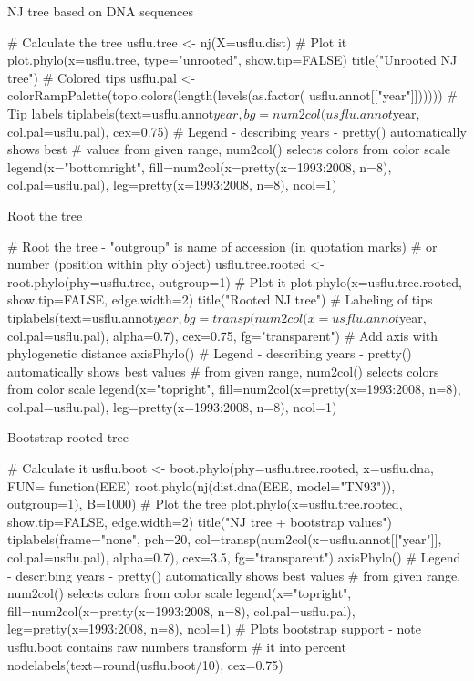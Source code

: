 \documentclass[compress, xelatex, 11pt, xcolor=svgnames, aspectratio=169,
	hyperref={
		bookmarks=true,
		unicode=true,
		colorlinks=true,
		pdftitle={Molecular data in R},
		plainpages=false,
		pdfauthor={Vojtech Zeisek},
		pdfsubject={Course about phylogeny and evolution in R},
		pdfcreator={XeLaTeX},
		pdfkeywords={R, evolution, phylogeny, molecular data},
		linkcolor=Crimson, %
		anchorcolor=Magenta, %
		citecolor=Magenta, %
		filecolor=Magenta, %
		menucolor=Magenta, %
		urlcolor=DodgerBlue, %
		},
	url={hyphens, lowtilde} %
	]{beamer}
\begin{document}
\begin{frame}[fragile]{NJ tree based on DNA sequences}
	\begin{spluscode}
    # Calculate the tree
    usflu.tree <- nj(X=usflu.dist)
    # Plot it
    plot.phylo(x=usflu.tree, type="unrooted", show.tip=FALSE)
    title("Unrooted NJ tree")
    # Colored tips
    usflu.pal <- colorRampPalette(topo.colors(length(levels(as.factor(
      usflu.annot[["year"]])))))
    # Tip labels
    tiplabels(text=usflu.annot$year, bg=num2col(usflu.annot$year,
      col.pal=usflu.pal), cex=0.75)
    # Legend - describing years - pretty() automatically shows best
    # values from given range, num2col() selects colors from color scale
    legend(x="bottomright", fill=num2col(x=pretty(x=1993:2008, n=8),
      col.pal=usflu.pal), leg=pretty(x=1993:2008, n=8), ncol=1)
	\end{spluscode}
\end{frame}

\begin{frame}[fragile]{Root the tree}
	\begin{spluscode}
    # Root the tree - "outgroup" is name of accession (in quotation marks)
    # or number (position within phy object)
    usflu.tree.rooted <- root.phylo(phy=usflu.tree, outgroup=1)
    # Plot it
    plot.phylo(x=usflu.tree.rooted, show.tip=FALSE, edge.width=2)
    title("Rooted NJ tree")
    # Labeling of tips
    tiplabels(text=usflu.annot$year, bg=transp(num2col(x=usflu.annot$year,
      col.pal=usflu.pal), alpha=0.7), cex=0.75, fg="transparent")
    # Add axis with phylogenetic distance
    axisPhylo()
    # Legend - describing years - pretty() automatically shows best values
    # from given range, num2col() selects colors from color scale
    legend(x="topright", fill=num2col(x=pretty(x=1993:2008, n=8),
      col.pal=usflu.pal), leg=pretty(x=1993:2008, n=8), ncol=1)
	\end{spluscode}
\end{frame}

\begin{frame}[fragile]{Bootstrap rooted tree}
	\begin{spluscode}
    # Calculate it
    usflu.boot <- boot.phylo(phy=usflu.tree.rooted, x=usflu.dna, FUN=
      function(EEE) root.phylo(nj(dist.dna(EEE, model="TN93")), outgroup=1),
      B=1000)
    # Plot the tree
    plot.phylo(x=usflu.tree.rooted, show.tip=FALSE, edge.width=2)
    title("NJ tree + bootstrap values")
    tiplabels(frame="none", pch=20, col=transp(num2col(x=usflu.annot[["year"]],
      col.pal=usflu.pal), alpha=0.7), cex=3.5, fg="transparent")
    axisPhylo()
    # Legend - describing years - pretty() automatically shows best values
    # from given range, num2col() selects colors from color scale
    legend(x="topright", fill=num2col(x=pretty(x=1993:2008, n=8),
      col.pal=usflu.pal), leg=pretty(x=1993:2008, n=8), ncol=1)
    # Plots bootstrap support - note usflu.boot contains raw numbers transform
    # it into percent
    nodelabels(text=round(usflu.boot/10), cex=0.75)
	\end{spluscode}
\end{frame}
\end{document}
